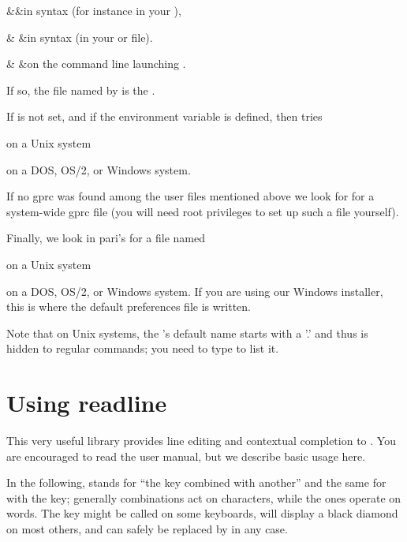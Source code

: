 \+&\quad&in  syntax
(for instance in your ),\cr

\+& &in  syntax
(in your  or  file).\cr

\+& &on the command line launching .\cr

\noindent If so, the file named by  is the .

\noindent\item If  is not set, and if the environment variable
 is defined,  then tries

 on a Unix system

 on a DOS, OS/2, or Windows system.

\noindent\item If no gprc was found among the user files mentioned above
we look for  for a system-wide gprc file (you will need root
privileges to set up such a file yourself).

\noindent\item Finally, we look in pari's  for a file named

 on a Unix system

 on a DOS, OS/2, or Windows system. If you are using our
Windows installer, this is where the default preferences file is written.

\noindent Note that on Unix systems, the 's default name starts
with a '.' and thus is hidden to regular  commands; you need to type
 to list it.


\section{Using readline} 

This very useful library provides line editing and contextual completion
to . You are encouraged to read the  user manual,
but we describe basic usage here.

\label{se:readline}
In the following,  stands for ``the  key combined with
another'' and the same for  with the  key; generally
 combinations act on characters, while the  ones operate on
words. The  key might be called  on some keyboards, will
display a black diamond on most others, and can safely be replaced by
 in any case.

